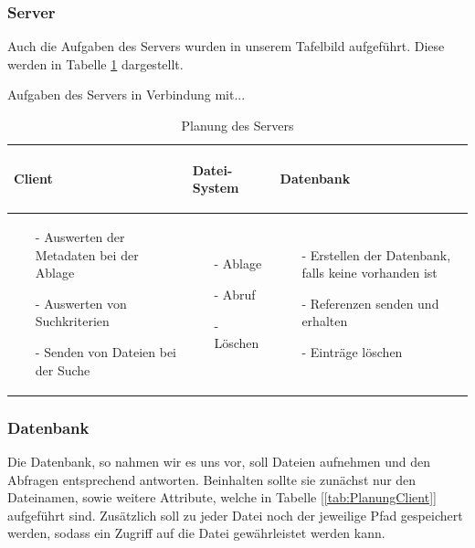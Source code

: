 \documentclass[12pt,a4paper,bibliography=totocnumbered,listof=totocnumbered]{scrartcl}
\begin{document}
\subsubsection{Server}
\label{sec:Server}
Auch die Aufgaben des Servers wurden in unserem Tafelbild aufgeführt. Diese werden in Tabelle \ref{tab:PlanungServer} dargestellt.

\vspace{1em}
\begin{table}[!h]
	\centering
	Aufgaben des Servers in Verbindung mit...\\
	\begin{tabular}{|p{4cm}|p{4cm}|p{4cm}|}
		\hline
			\begin{center}
				\textbf{Client}
			\end{center}
			&
			\begin{center}
				\textbf{Datei-System}
			\end{center}
			&
			\begin{center}
				\textbf{Datenbank}
			\end{center}
		\\
		\hline
			\begin{itemize}[]
				\item[-]Auswerten der Metadaten bei der Ablage
				\item[-]Auswerten von Suchkriterien
				\item[-]Senden von Dateien bei der Suche
			\end{itemize}
			&
			\begin{itemize}[]
				\item[-]Ablage
				\item[-]Abruf
				\item[-]Löschen
			\end{itemize}
			&
			\begin{itemize}[]
				\item[-]Erstellen der Datenbank, falls keine vorhanden ist
				\item[-]Referenzen senden und erhalten
				\item[-]Einträge löschen
			\end{itemize}
		\\
		\hline
	\end{tabular}
	\caption{Planung des Servers}
	\label{tab:PlanungServer}
\end{table}

\subsubsection{Datenbank}
\label{sec:Datenbank}
Die Datenbank, so nahmen wir es uns vor, soll Dateien aufnehmen und den Abfragen entsprechend antworten. Beinhalten sollte sie zunächst nur den Dateinamen, sowie weitere Attribute, welche in Tabelle [\ref{tab:PlanungClient}] aufgeführt sind. Zusätzlich soll zu jeder Datei noch der jeweilige  Pfad gespeichert werden, sodass ein Zugriff auf die Datei gewährleistet werden kann.
\end{document}
